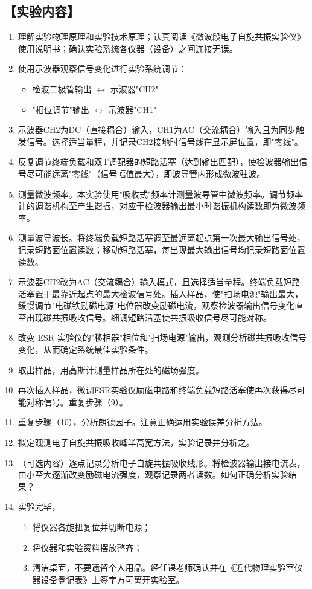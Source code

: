 \documentclass[12pt,a4paper,UTF8]{ctexart}
\begin{document}
\subsection*{【实验内容】}
\begin{enumerate}
    \item 理解实验物理原理和实验技术原理；认真阅读《微波段电子自旋共振实验仪》使用说明书；确认实验系统各仪器（设备）之间连接无误。
    \item 使用示波器观察信号变化进行实验系统调节：
    \begin{itemize}
            \item 检波二极管输出 $\leftrightarrow$ 示波器"CH2"
            \item "相位调节"输出 $\leftrightarrow$ 示波器"CH1"
    \end{itemize}
    \item 示波器CH2为DC（直接耦合）输入，CH1为AC（交流耦合）输入且为同步触发信号。选择适当量程，并记录CH2接地时信号线在显示屏位置，即"零线"。
    \item 反复调节终端负载和双T调配器的短路活塞（达到输出匹配），使检波器输出信号尽可能远离"零线"（信号幅值最大），即波导管内形成微波驻波。
    \item 测量微波频率。本实验使用"吸收式"频率计测量波导管中微波频率。调节频率计的调谐机构至产生谐振，对应于检波器输出最小时谐振机构读数即为微波频率。
    \item 测量波导波长。将终端负载短路活塞调至最远离起点第一次最大输出信号处，记录短路面位置读数；移动短路活塞，每出现最大输出信号均记录短路面位置读数。
    \item 示波器CH2改为AC（交流耦合）输入模式，且选择适当量程。终端负载短路活塞置于最靠近起点的最大检波信号处。插入样品，使"扫场电源"输出最大，缓慢调节"电磁铁励磁电源"电位器改变励磁电流，观察检波器输出信号变化直至出现磁共振吸收信号。细调短路活塞使共振吸收信号尽可能对称。
    \item 改变 ESR 实验仪的"移相器"相位和"扫场电源"输出，观测分析磁共振吸收信号变化，从而确定系统最佳实验条件。
    \item 取出样品，用高斯计测量样品所在处的磁场强度。
    \item 再次插入样品，微调ESR实验仪励磁电路和终端负载短路活塞使再次获得尽可能对称信号。重复步骤（9）。
    \item 重复步骤（10），分析朗德因子。注意正确运用实验误差分析方法。
    \item 拟定观测电子自旋共振吸收峰半高宽方法，实验记录并分析之。
    \item （可选内容）逐点记录分析电子自旋共振吸收线形。将检波器输出接电流表，由小至大逐渐改变励磁电流强度，观察记录两者读数。如何正确分析实验结果？
    \item 实验完毕，
    \begin{enumerate}[(1)]
        \item 将仪器各旋扭复位并切断电源；
        \item 将仪器和实验资料摆放整齐；
        \item 清洁桌面，不要遗留个人用品。经任课老师确认并在《近代物理实验室仪器设备登记表》上签字方可离开实验室。
    \end{enumerate}
\end{enumerate}
\end{document}
